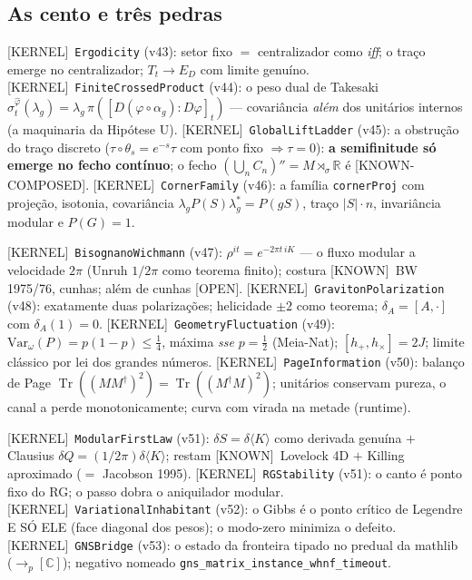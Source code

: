 \documentclass[11pt]{article}
\providecommand{\kernelmk}[1]{\textsf{[KERNEL]}~\texttt{#1}}\providecommand{\knownmk}[1]{\textsf{[KNOWN]}~{#1}}\providecommand{\statusmk}[1]{\textsf{[#1]}}
\theoremstyle{definition}\newtheorem{deriv}{Derivação}
\begin{document}
\subsection*{As cento e três pedras}

\kernelmk{Ergodicity} (v43): setor fixo $=$ centralizador como \emph{iff}; o traço emerge no centralizador; $T_t\to E_D$ com limite genuíno. \kernelmk{FiniteCrossedProduct} (v44): o peso dual de Takesaki $\sigma^{\hat\varphi}_t(\lambda_g)=\lambda_g\,\pi([D(\varphi\circ\alpha_g):D\varphi]_t)$ --- covariância \emph{além} dos unitários internos (a maquinaria da Hipótese U). \kernelmk{GlobalLiftLadder} (v45): a obstrução do traço discreto ($\tau\circ\theta_s=e^{-s}\tau$ com ponto fixo $\Rightarrow\tau=0$): \textbf{a semifinitude só emerge no fecho contínuo}; o fecho $(\bigcup_n C_n)''=M\rtimes_\sigma\mathbb{R}$ é \statusmk{KNOWN-COMPOSED}. \kernelmk{CornerFamily} (v46): a família \texttt{cornerProj} com projeção, isotonia, covariância $\lambda_g P(S)\lambda_g^*=P(gS)$, traço $|S|\cdot n$, invariância modular e $P(G)=1$.

\kernelmk{BisognanoWichmann} (v47): $\rho^{it}=e^{-2\pi t\,iK}$ --- o fluxo modular a velocidade $2\pi$ (Unruh $1/2\pi$ como teorema finito); costura \knownmk{BW 1975/76, cunhas}; além de cunhas \statusmk{OPEN}. \kernelmk{GravitonPolarization} (v48): exatamente duas polarizações; helicidade $\pm2$ como teorema; $\delta_A=[A,\cdot]$ com $\delta_A(1)=0$. \kernelmk{GeometryFluctuation} (v49): $\mathrm{Var}_\omega(P)=p(1-p)\le\tfrac14$, máxima \emph{sse} $p=\tfrac12$ (Meia-Nat); $[h_+,h_\times]=2J$; limite clássico por lei dos grandes números. \kernelmk{PageInformation} (v50): balanço de Page $\operatorname{Tr}((MM^\dagger)^2)=\operatorname{Tr}((M^\dagger M)^2)$; unitários conservam pureza, o canal a perde monotonicamente; curva com virada na metade (runtime).

\kernelmk{ModularFirstLaw} (v51): $\delta S=\delta\langle K\rangle$ como derivada genuína $+$ Clausius $\delta Q=(1/2\pi)\delta\langle K\rangle$; restam \knownmk{Lovelock 4D} $+$ Killing aproximado ($=$ Jacobson 1995). \kernelmk{RGStability} (v51): o canto é ponto fixo do RG; o passo dobra o aniquilador modular. \kernelmk{VariationalInhabitant} (v52): o Gibbs é o ponto crítico de Legendre E SÓ ELE (face diagonal dos pesos); o modo-zero minimiza o defeito. \kernelmk{GNSBridge} (v53): o estado da fronteira tipado no predual da mathlib ($\to_{\!p}[\mathbb{C}]$); negativo nomeado \texttt{gns\_matrix\_instance\_whnf\_timeout}.
\end{document}
